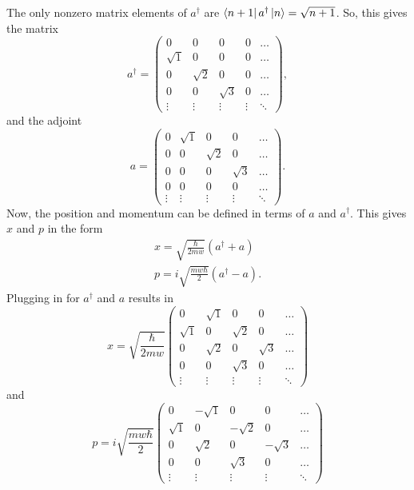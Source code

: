 \documentclass[12pt]{article}
\begin{document}
The only nonzero matrix elements of $a^\dagger$ are $\Bra{n+1} a^\dagger \Ket{n} = \sqrt{n+1}$. So, this gives the matrix
\[ a^\dagger = \left( \begin{array}{ccccc}
0 & 0 & 0 & 0 & \ldots \\
\sqrt{1} & 0 & 0 & 0 & \ldots \\
0 & \sqrt{2} & 0 & 0 & \ldots \\
0 & 0 & \sqrt{3} & 0 & \ldots \\
\vdots & \vdots & \vdots & \vdots & \ddots \end{array} \right),\]
and the adjoint
\[ a= \left( \begin{array}{ccccc}
0 & \sqrt{1}  & 0 & 0 & \ldots \\
0 & 0 & \sqrt{2}  & 0 & \ldots \\
0 & 0 & 0 & \sqrt{3}  & \ldots \\
0 & 0 & 0 & 0 & \ldots \\
\vdots & \vdots & \vdots & \vdots & \ddots \end{array} \right).\]
Now, the position and momentum can be defined in terms of $a$ and $a^\dagger$. This gives $x$ and $p$ in the form
\begin{gather}
x = \sqrt{\frac{\hbar}{2mw}}(a^\dagger + a) \\
p = i\sqrt{\frac{mw\hbar}{2}}(a^\dagger - a).
\end{gather}
Plugging in for $a^\dagger$ and $a$ results in
\[ x= \sqrt{\frac{\hbar}{2mw}} \left( \begin{array}{ccccc}
0 & \sqrt{1}  & 0 & 0 & \ldots \\
\sqrt{1} & 0 & \sqrt{2}  & 0 & \ldots \\
0 & \sqrt{2} & 0 & \sqrt{3}  & \ldots \\
0 & 0 & \sqrt{3} & 0 & \ldots \\
\vdots & \vdots & \vdots & \vdots & \ddots \end{array} \right)\]
and
\[ p= i\sqrt{\frac{mw\hbar}{2}} \left( \begin{array}{ccccc}
0 & -\sqrt{1}  & 0 & 0 & \ldots \\
\sqrt{1} & 0 & -\sqrt{2}  & 0 & \ldots \\
0 & \sqrt{2} & 0 & -\sqrt{3}  & \ldots \\
0 & 0 & \sqrt{3} & 0 & \ldots \\
\vdots & \vdots & \vdots & \vdots & \ddots \end{array} \right)\]
\end{document}
